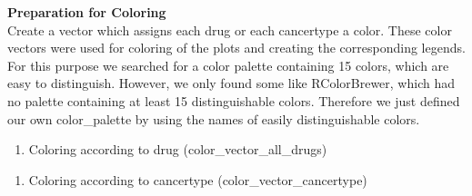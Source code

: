 \documentclass[]{article}
\newenvironment{Shaded}{\begin{snugshade}}{\end{snugshade}}
\newcommand{\CommentTok}[1]{\textcolor[rgb]{0.56,0.35,0.01}{\textit{#1}}}
\newcommand{\ControlFlowTok}[1]{\textcolor[rgb]{0.13,0.29,0.53}{\textbf{#1}}}
\newcommand{\DecValTok}[1]{\textcolor[rgb]{0.00,0.00,0.81}{#1}}
\newcommand{\KeywordTok}[1]{\textcolor[rgb]{0.13,0.29,0.53}{\textbf{#1}}}
\newcommand{\NormalTok}[1]{#1}
\newcommand{\OperatorTok}[1]{\textcolor[rgb]{0.81,0.36,0.00}{\textbf{#1}}}
\newcommand{\StringTok}[1]{\textcolor[rgb]{0.31,0.60,0.02}{#1}}
\providecommand{\tightlist}{%
  \setlength{\itemsep}{0pt}\setlength{\parskip}{0pt}}
\begin{document}
\textbf{Preparation for Coloring}\\
Create a vector which assigns each drug or each cancertype a color.
These color vectors were used for coloring of the plots and creating the
corresponding legends. For this purpose we searched for a color palette
containing 15 colors, which are easy to distinguish. However, we only
found some like RColorBrewer, which had no palette containing at least
15 distinguishable colors. Therefore we just defined our own
color\_palette by using the names of easily distinguishable colors.

\begin{enumerate}
\def\labelenumi{\arabic{enumi}.}
\tightlist
\item
  Coloring according to drug (color\_vector\_all\_drugs)
\end{enumerate}

\begin{Shaded}
\end{Shaded}

\begin{enumerate}
\def\labelenumi{\arabic{enumi}.}
\setcounter{enumi}{1}
\tightlist
\item
  Coloring according to cancertype (color\_vector\_cancertype)
\end{enumerate}
\end{document}

